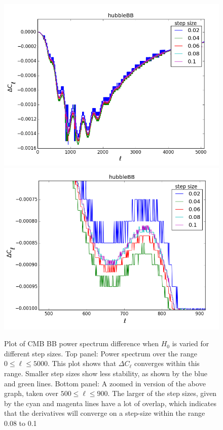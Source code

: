 \begin{figure}[tbhp]
\centering
\includegraphics[scale=0.65]{images/diffs/H0bb.png}
\includegraphics[scale=0.65]{images/diffs/H0bbz.png}
\caption{Plot of CMB BB power spectrum difference when $H_{0}$ is varied for different step sizes. Top panel: Power spectrum over the range $0 \leq \ell \leq 5000$. This plot shows that $\Delta C_{\ell}$ converges within this range. Smaller step sizes show less stability, as shown by the blue and green lines. Bottom panel: A zoomed in version of the above graph, taken over $500 \leq \ell \leq 900$. The larger of the step sizes, given by the cyan and magenta lines have a lot of overlap, which indicates that the derivatives will converge on a step-size within the range 0.08 to 0.1}
\label{fig:diffH0}
\end{figure}

